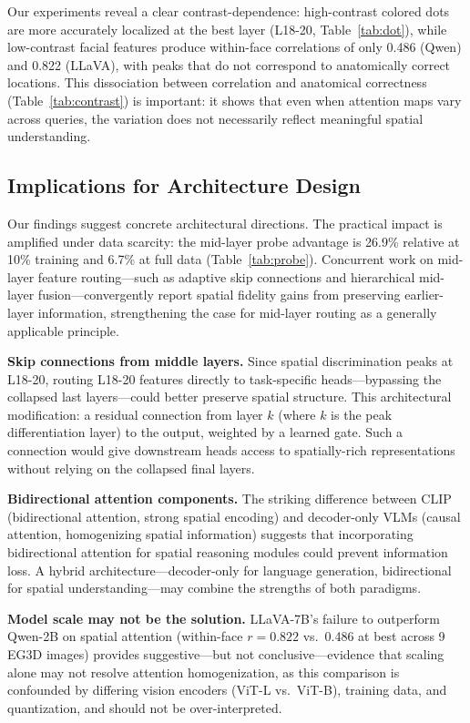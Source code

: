\documentclass[10pt,twocolumn,letterpaper]{article}
\begin{document}
Our experiments reveal a clear contrast-dependence: high-contrast colored dots are more accurately localized at the best layer (L18-20, Table~\ref{tab:dot}), while low-contrast facial features produce within-face correlations of only 0.486 (Qwen) and 0.822 (LLaVA), with peaks that do not correspond to anatomically correct locations. This dissociation between correlation and anatomical correctness (Table~\ref{tab:contrast}) is important: it shows that even when attention maps vary across queries, the variation does not necessarily reflect meaningful spatial understanding.

\subsection{Implications for Architecture Design}

Our findings suggest concrete architectural directions. The practical impact is amplified under data scarcity: the mid-layer probe advantage is 26.9\% relative at 10\% training and 6.7\% at full data (Table~\ref{tab:probe}). Concurrent work on mid-layer feature routing---such as adaptive skip connections and hierarchical mid-layer fusion---convergently report spatial fidelity gains from preserving earlier-layer information, strengthening the case for mid-layer routing as a generally applicable principle.

\noindent\textbf{Skip connections from middle layers.} Since spatial discrimination peaks at L18-20, routing L18-20 features directly to task-specific heads---bypassing the collapsed last layers---could better preserve spatial structure. This architectural modification: a residual connection from layer $k$ (where $k$ is the peak differentiation layer) to the output, weighted by a learned gate. Such a connection would give downstream heads access to spatially-rich representations without relying on the collapsed final layers.

\noindent\textbf{Bidirectional attention components.} The striking difference between CLIP (bidirectional attention, strong spatial encoding) and decoder-only VLMs (causal attention, homogenizing spatial information) suggests that incorporating bidirectional attention for spatial reasoning modules could prevent information loss. A hybrid architecture---decoder-only for language generation, bidirectional for spatial understanding---may combine the strengths of both paradigms.

\noindent\textbf{Model scale may not be the solution.} LLaVA-7B's failure to outperform Qwen-2B on spatial attention (within-face $r=0.822$ vs.\ 0.486 at best across 9 EG3D images) provides suggestive---but not conclusive---evidence that scaling alone may not resolve attention homogenization, as this comparison is confounded by differing vision encoders (ViT-L vs.\ ViT-B), training data, and quantization, and should not be over-interpreted.
\end{document}
